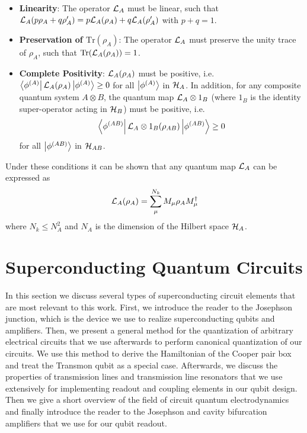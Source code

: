 \begin{itemize}
\item \textbf{Linearity}: The operator $\LA$ must be linear, such that \mbox{$\LA(p\rho_A+q\rho'_A)=p\LA(\rho_A)+q\LA(\rho'_A)$} with $p+q=1$. 
\item \textbf{Preservation of $\mathrm{Tr}(\rho_A)$}: The operator $\LA$ must preserve the unity trace of $\rho_A$, such that $\mathrm{Tr}(\LA(\rho_A))=1$.
\item \textbf{Complete Positivity}: $\LA(\rho_A)$ must be positive, i.e. $\bra{\phi^{(A)}}\LA(\rho_A)\ket{\phi^{(A)}}\ge 0$ for all $\left| \phi^{(A)} \right>$ in $\begin{mathcal}H\end{mathcal}_A$. In addition, for any composite quantum system $A\otimes B$, the quantum map $\LA	\otimes \mathrm{1}_B$ (where $\mathrm{1}_B$ is the identity super-operator acting in $\begin{mathcal}H\end{mathcal}_B$) must be positive, i.e. $$\bra{\phi^{(AB)}}\LA\otimes\mathrm{1}_B(\rho_{AB})\ket{\phi^{(AB)}}\ge 0$$ for all $\left| \phi^{(AB)} \right>$ in $\begin{mathcal}H\end{mathcal}_{AB}$.
\end{itemize}

Under these conditions it can be shown that any quantum map $\LA$ can be expressed as \citep{kraus_states_1983}
%
\begin{equation}
\LA(\rho_A) = \sum\limits_\mu^{N_k} M_\mu \rho_A M_\mu^\dagger
\end{equation}
%
where $N_k \le N_A^2$ and $N_A$ is the dimension of the Hilbert space $\begin{mathcal}H\end{mathcal}_A$.

\section{Superconducting Quantum Circuits}

In this section we discuss several types of superconducting circuit elements that are most relevant to this work. First, we introduce the reader to the Josephson junction, which is the device we use to realize superconducting qubits and amplifiers. Then, we present a general method for the quantization of arbitrary electrical circuits that we use afterwards to perform canonical quantization of our circuits. We use this method to derive the Hamiltonian of the Cooper pair box and treat the Transmon qubit as a special case. Afterwards, we discuss the properties of transmission lines and transmission line resonators that we use extensively for implementing readout and coupling elements in our qubit design. Then we give a short overview of the field of circuit quantum electrodynamics and finally introduce the reader to the Josephson and cavity bifurcation amplifiers that we use for our qubit readout.

